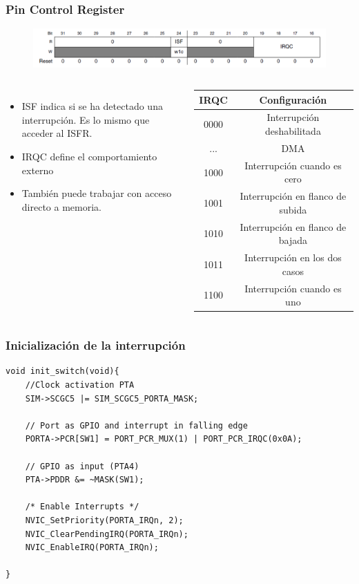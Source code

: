 \documentclass[10.5pt,scale=1.0,t,aspectratio=169,hyperref={pdfpagelabels=false}]{beamer}
\begin{document}
\begin{frame}
	\frametitle{Pin Control Register}
	\begin{figure}
		\centering
		\includegraphics[scale=0.6]{07_PCR}
	\end{figure}
	\begin{columns}
		\begin{itemize}
			\item ISF indica si se ha detectado una interrupción. Es lo mismo que acceder al ISFR.
			\item IRQC define el comportamiento externo
			\item También puede trabajar con acceso directo a memoria.
		\end{itemize}
		
		\begin{table}
			\begin{tabular}{cc}
				\hline 
				\textbf{IRQC} & \textbf{Configuración} \\
				\hline
				0000 & Interrupción deshabilitada \\
				... & DMA \\
				1000 & Interrupción cuando es cero \\
				1001 & Interrupción en flanco de subida \\
				1010 & Interrupción en flanco de bajada \\
				1011 & Interrupción en los dos casos\\
				1100 & Interrupción cuando es uno \\
				\hline
			\end{tabular}
		\end{table}
	\end{columns}
\end{frame}
\begin{frame}[fragile]
	\frametitle{Inicialización de la interrupción}
	\begin{lstlisting}[style=CStyle]
void init_switch(void){
	//Clock activation PTA
	SIM->SCGC5 |= SIM_SCGC5_PORTA_MASK; 
	
	// Port as GPIO and interrupt in falling edge
	PORTA->PCR[SW1] = PORT_PCR_MUX(1) | PORT_PCR_IRQC(0x0A);
	
	// GPIO as input (PTA4)
	PTA->PDDR &= ~MASK(SW1);
	
	/* Enable Interrupts */
	NVIC_SetPriority(PORTA_IRQn, 2);
	NVIC_ClearPendingIRQ(PORTA_IRQn);
	NVIC_EnableIRQ(PORTA_IRQn);
	
}
	\end{lstlisting}
\end{frame}
\end{document}
